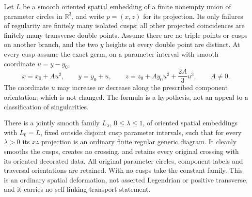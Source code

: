 \begin{lemma}
\label{ce:rounding}\leanok
Let $L$ be a smooth oriented spatial embedding of a finite nonempty union
of parameter circles in $\mathbb R^3$, and write $p=(x,z)$ for its
projection. Its only failures of regularity are finitely many isolated
cusps; all other projected coincidences are finitely many transverse
double points. Assume there are no triple points or cusps on another
branch, and the two $y$ heights at every double point are distinct.
At every cusp assume the exact germ, on a parameter interval with smooth
coordinate $u=y-y_0$,
\begin{equation}\label{ce:exact-germ}
 x=x_0+Au^2,\qquad y=y_0+u,\qquad
 z=z_0+Ay_0u^2+\frac{2A}{3}u^3,\qquad A\ne0.
\end{equation}
The coordinate $u$ may increase or decrease along the prescribed component
orientation, which is not changed. The formula is a hypothesis, not an
appeal to a classification of singularities.

There is a jointly smooth family $L_\lambda$, $0\leq\lambda\leq1$, of
oriented spatial embeddings with $L_0=L$, fixed outside disjoint cusp
parameter intervals, such that for every $\lambda>0$ its $xz$ projection
is an ordinary finite regular generic diagram. It cleanly smooths the
cusps, creates no crossing, and retains every original crossing with
its oriented decorated data. All original parameter circles, component
labels and traversal orientations are retained. With no cusps take the
constant family.
This is an ordinary spatial deformation, not asserted Legendrian or
positive transverse, and it carries no self-linking transport statement.

\end{lemma}
